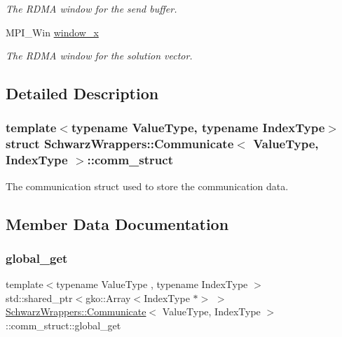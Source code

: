 \begin{DoxyCompactItemize}
\begin{DoxyCompactList}\small\item\em The R\+D\+MA window for the send buffer. \end{DoxyCompactList}\item 
\mbox{\label{structSchwarzWrappers_1_1Communicate_1_1comm__struct_ad2f23f5eb2386dea7137c58fc58facb4}} 
M\+P\+I\+\_\+\+Win \hyperlink{structSchwarzWrappers_1_1Communicate_1_1comm__struct_ad2f23f5eb2386dea7137c58fc58facb4}{window\+\_\+x}
\begin{DoxyCompactList}\small\item\em The R\+D\+MA window for the solution vector. \end{DoxyCompactList}\end{DoxyCompactItemize}


\subsection{Detailed Description}
\subsubsection*{template$<$typename Value\+Type, typename Index\+Type$>$\newline
struct Schwarz\+Wrappers\+::\+Communicate$<$ Value\+Type, Index\+Type $>$\+::comm\+\_\+struct}

The communication struct used to store the communication data. 

\subsection{Member Data Documentation}
\mbox{\label{structSchwarzWrappers_1_1Communicate_1_1comm__struct_a400123c78e4206aadf2eb22825251790}} 
\subsubsection{\texorpdfstring{global\+\_\+get}{global\_get}}
{\footnotesize\ttfamily template$<$typename Value\+Type , typename Index\+Type $>$ \\
std\+::shared\+\_\+ptr$<$gko\+::\+Array$<$Index\+Type $\ast$$>$ $>$ \hyperlink{classSchwarzWrappers_1_1Communicate}{Schwarz\+Wrappers\+::\+Communicate}$<$ Value\+Type, Index\+Type $>$\+::comm\+\_\+struct\+::global\+\_\+get}



